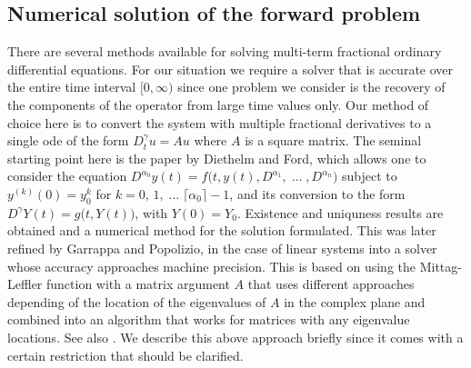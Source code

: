 \subsection{Numerical solution of the forward problem}

There are several methods available for solving multi-term
fractional ordinary differential equations.
For our situation we require a solver that is accurate over the entire
time interval $[0,\infty)$ since one problem we consider
is the recovery of the components of the operator from large time values only.
Our method of choice here is to convert the system with multiple
fractional derivatives to a single 
{\sc ode}
of the form  $D_t^\gamma u = A u$
where $A$ is a square matrix.
The seminal starting point here is the paper by Diethelm and Ford,
\cite{DiethelmFord:2004} which allows one to consider the equation
$D^{\alpha_0} y(t) = f\bigl(t,y(t),D^{\alpha_1},\;\ldots\;,D^{\alpha_n}\bigr)$
subject to $y^{(k)}(0) = y_0^k$ for $k=0,\,1,\;\ldots\;\lceil\alpha_0\rceil-1$,
and its conversion to the form $D^\gamma Y(t) = g\bigl(t,Y(t)\bigr)$,
with $Y(0) = Y_0$.
Existence and uniquness results are obtained and a numerical method for
the solution formulated.
This was later refined by Garrappa and Popolizio,
\cite{GarrappaPopolizio:2018} in the case of linear systems
into a solver whose accuracy approaches machine precision.
This is based on using the Mittag-Leffler function with a matrix argument $A$
that uses different approaches depending of the location of the
eigenvalues of $A$ in the complex plane and combined into an algorithm that
works for matrices with any eigenvalue locations.
See also \cite{Popolizio:2018}.
We describe this above approach briefly since it comes with a certain
restriction that should be clarified.

